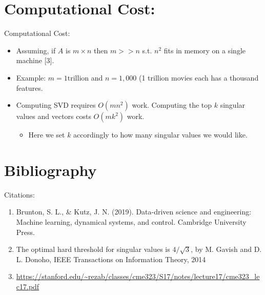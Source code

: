 \documentclass[9pt]{beamer}
\begin{document}
\section{Computational Cost:}

\begin{frame}{Computational Cost:}
    \begin{itemize}
        \item Assuming, if $A$ is $m \times n$ then $m >> n$ s.t. $n^{2}$ fits in memory on a single machine [3]. 
        \item Example: $m = 1 \text{trillion}$ and $n = 1,000$ (1 trillion movies each has a thousand features. 
        \item Computing SVD requires $O(mn^{2})$ work. Computing the top $k$ singular values and vectors costs $O(mk^{2})$ work. 
        \begin{itemize}
            \item Here we set $k$ accordingly to how many singular values we would like.
        \end{itemize}
    \end{itemize}
\end{frame}

\section{Bibliography}

\begin{frame}{Citations:}
    \begin{enumerate}
        \item Brunton, S. L., & Kutz, J. N. (2019). Data-driven science and engineering: Machine learning, dynamical systems, and control. Cambridge University Press.
        \item The optimal hard threshold for singular values is $4/\sqrt{3}$, by M. Gavish and
        D. L. Donoho, IEEE Transactions on Information Theory, 2014
        \item \url{https://stanford.edu/~rezab/classes/cme323/S17/notes/lecture17/cme323_lec17.pdf} 
    \end{enumerate}
\end{frame}
\end{document}
